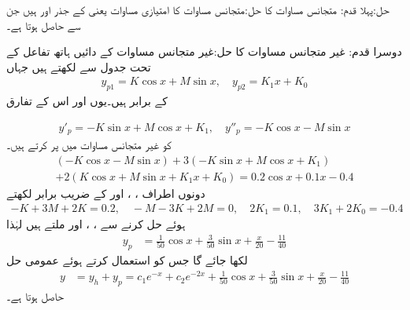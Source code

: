 حل:پہلا قدم: متجانس مساوات کا حل:\quad متجانس مساوات  کا امتیازی مساوات  یعنی   کے جذر  اور  ہیں جن سے   حاصل ہوتا ہے۔

دوسرا قدم: غیر متجانس مساوات کا حل:\quad غیر متجانس مساوات کے دائیں ہاتھ تفاعل کے تحت جدول  سے
   لکھتے ہیں جہاں 
\begin{align*}
y_{p1}=K\cos x+M\sin x, \quad y_{p2}=K_1x+K_0
\end{align*}
کے برابر ہیں۔یوں  اور اس کے تفارق 

\begin{align*}
y'_p=-K\sin x+M\cos x+K_1, \quad y''_p=-K\cos x-M\sin x
\end{align*}
کو غیر متجانس مساوات میں پر کرتے ہیں۔
\begin{multline*}
(-K\cos x-M\sin x)+3(-K\sin x+M\cos x+K_1)\\
+2(K\cos x+M\sin x+K_1x+K_0)=0.2\cos x+0.1x-0.4
\end{multline*}
دونوں اطراف ، ،  اور  کے  ضریب  برابر لکھتے
\begin{align*}
-K+3M+2K=0.2, \quad -M-3K+2M=0, \quad 2K_1=0.1, \quad 3K_1+2K_0=-0.4
\end{align*}
ہوئے حل کرنے سے ، ،  اور  ملتے ہیں لہٰذا 
\begin{align*}
y_p&=\tfrac{1}{50}\cos x+\tfrac{3}{50}\sin x+\tfrac{x}{20}-\frac{11}{40}
\end{align*}
لکھا جائے گا جس کو استعمال کرتے ہوئے عمومی حل
\begin{align*}
y&=y_h+y_p=c_1e^{-x}+c_2e^{-2x}+\tfrac{1}{50}\cos x+\tfrac{3}{50}\sin x+\tfrac{x}{20}-\frac{11}{40}
\end{align*}
حاصل ہوتا ہے۔

